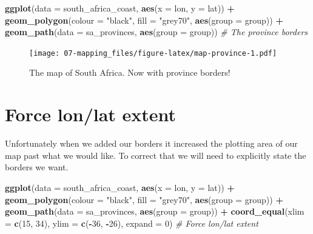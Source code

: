 \documentclass[]{book}
\newenvironment{Shaded}{\begin{snugshade}}{\end{snugshade}}
\newcommand{\KeywordTok}[1]{\textcolor[rgb]{0.13,0.29,0.53}{\textbf{#1}}}
\newcommand{\DataTypeTok}[1]{\textcolor[rgb]{0.13,0.29,0.53}{#1}}
\newcommand{\DecValTok}[1]{\textcolor[rgb]{0.00,0.00,0.81}{#1}}
\newcommand{\StringTok}[1]{\textcolor[rgb]{0.31,0.60,0.02}{#1}}
\newcommand{\CommentTok}[1]{\textcolor[rgb]{0.56,0.35,0.01}{\textit{#1}}}
\newcommand{\OperatorTok}[1]{\textcolor[rgb]{0.81,0.36,0.00}{\textbf{#1}}}
\newcommand{\NormalTok}[1]{#1}
\theoremstyle{definition}
\theoremstyle{definition}
\theoremstyle{definition}
\theoremstyle{remark}
\begin{document}
\begin{Shaded}
\begin{Highlighting}[]
\KeywordTok{ggplot}\NormalTok{(}\DataTypeTok{data =}\NormalTok{ south_africa_coast, }\KeywordTok{aes}\NormalTok{(}\DataTypeTok{x =}\NormalTok{ lon, }\DataTypeTok{y =}\NormalTok{ lat)) }\OperatorTok{+}
\StringTok{  }\KeywordTok{geom_polygon}\NormalTok{(}\DataTypeTok{colour =} \StringTok{"black"}\NormalTok{, }\DataTypeTok{fill =} \StringTok{"grey70"}\NormalTok{, }\KeywordTok{aes}\NormalTok{(}\DataTypeTok{group =}\NormalTok{ group)) }\OperatorTok{+}
\StringTok{  }\KeywordTok{geom_path}\NormalTok{(}\DataTypeTok{data =}\NormalTok{ sa_provinces, }\KeywordTok{aes}\NormalTok{(}\DataTypeTok{group =}\NormalTok{ group)) }\CommentTok{# The province borders}
\end{Highlighting}
\end{Shaded}

\begin{figure}
\centering
\texttt{[image: 07-mapping\_files/figure-latex/map-province-1.pdf]}
\caption{\label{fig:map-province}The map of South Africa. Now with province
borders!}
\end{figure}

\section{Force lon/lat extent}\label{force-lonlat-extent}

Unfortunately when we added our borders it increased the plotting area
of our map past what we would like. To correct that we will need to
explicitly state the borders we want.

\begin{Shaded}
\begin{Highlighting}[]
\KeywordTok{ggplot}\NormalTok{(}\DataTypeTok{data =}\NormalTok{ south_africa_coast, }\KeywordTok{aes}\NormalTok{(}\DataTypeTok{x =}\NormalTok{ lon, }\DataTypeTok{y =}\NormalTok{ lat)) }\OperatorTok{+}
\StringTok{  }\KeywordTok{geom_polygon}\NormalTok{(}\DataTypeTok{colour =} \StringTok{"black"}\NormalTok{, }\DataTypeTok{fill =} \StringTok{"grey70"}\NormalTok{, }\KeywordTok{aes}\NormalTok{(}\DataTypeTok{group =}\NormalTok{ group)) }\OperatorTok{+}
\StringTok{  }\KeywordTok{geom_path}\NormalTok{(}\DataTypeTok{data =}\NormalTok{ sa_provinces, }\KeywordTok{aes}\NormalTok{(}\DataTypeTok{group =}\NormalTok{ group)) }\OperatorTok{+}\StringTok{ }
\StringTok{  }\KeywordTok{coord_equal}\NormalTok{(}\DataTypeTok{xlim =} \KeywordTok{c}\NormalTok{(}\DecValTok{15}\NormalTok{, }\DecValTok{34}\NormalTok{), }\DataTypeTok{ylim =} \KeywordTok{c}\NormalTok{(}\OperatorTok{-}\DecValTok{36}\NormalTok{, }\OperatorTok{-}\DecValTok{26}\NormalTok{), }\DataTypeTok{expand =} \DecValTok{0}\NormalTok{) }\CommentTok{# Force lon/lat extent}
\end{Highlighting}
\end{Shaded}
\end{document}
